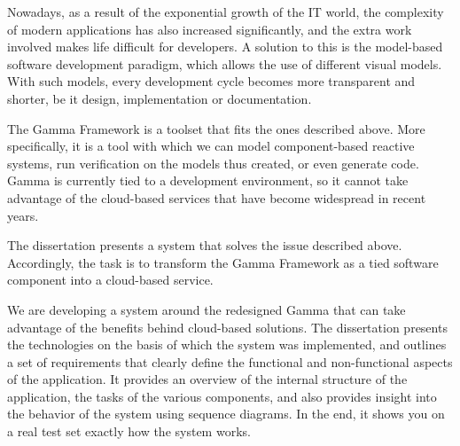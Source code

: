 Nowadays, as a result of the exponential growth of the IT world, the complexity of modern applications has also increased significantly, and the extra work involved makes life difficult for developers. A solution to this is the model-based software development paradigm, which allows the use of different visual models. With such models, every development cycle becomes more transparent and shorter, be it design, implementation or documentation.


The Gamma Framework is a toolset that fits the ones described above. More specifically, it is a tool with which we can model component-based reactive systems, run verification on the models thus created, or even generate code. Gamma is currently tied to a development environment, so it cannot take advantage of the cloud-based services that have become widespread in recent years.


The dissertation presents a system that solves the issue described above. Accordingly, the task is to transform the Gamma Framework as a tied software component into a cloud-based service.

We are developing a system around the redesigned Gamma that can take advantage of the benefits behind cloud-based solutions. The dissertation presents the technologies on the basis of which the system was implemented, and outlines a set of requirements that clearly define the functional and non-functional aspects of the application. It provides an overview of the internal structure of the application, the tasks of the various components, and also provides insight into the behavior of the system using sequence diagrams. In the end, it shows you on a real test set exactly how the system works.
\vfill
\cleardoublepage

\selectthesislanguage

\setcounter{romanPage}{\value{page}}
